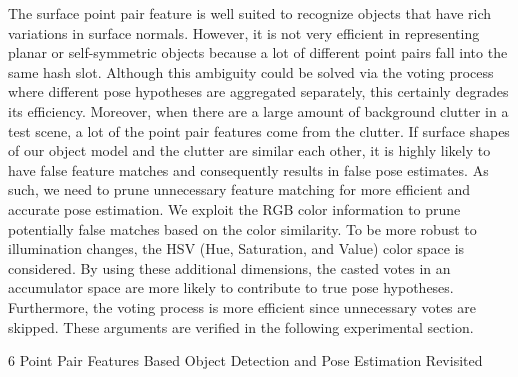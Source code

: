 \documentclass[10]{article}
\begin{document}
The surface point pair feature is well suited to recognize objects that have rich variations in surface normals. However, it is not very efficient in representing planar or self-symmetric objects because a lot of different point pairs fall into the same hash slot. Although this ambiguity could be solved via the voting process where different pose hypotheses are aggregated separately, this certainly degrades its efficiency. Moreover, when there are a large amount of background clutter in a test scene, a lot of the point pair features come from the clutter. If surface shapes of our object model and the clutter are similar each other, it is highly likely to have false feature matches and consequently results in false pose estimates. As such, we need to prune unnecessary feature matching for more efficient and accurate pose estimation. We exploit the RGB color information to
prune potentially false matches based on the color similarity. To be more robust to illumination changes, the HSV (Hue, Saturation, and Value) color space is considered. By using these additional dimensions, the casted votes in an accumulator space are more likely to contribute to true pose hypotheses. Furthermore, the voting process is more efficient since unnecessary votes are skipped. These arguments are verified in the following experimental section.


6 Point Pair Features Based Object Detection and Pose Estimation Revisited\\
\end{document}
